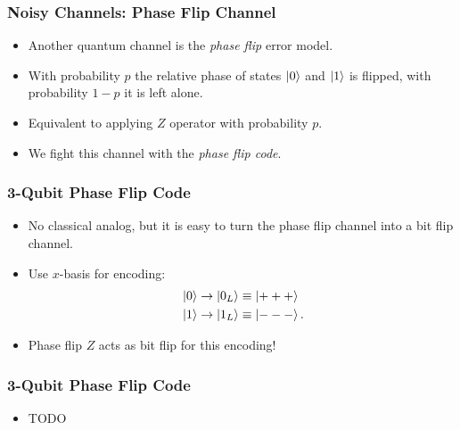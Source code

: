 \documentclass{beamer}
\begin{document}
\begin{frame}
    \frametitle{Noisy Channels: Phase Flip Channel}
    \begin{itemize}
        \item Another quantum channel is the \textit{phase flip} error model.
        \item With probability $p$ the relative phase of states $\left\vert{0}\right\rangle$ and $\left\vert{1}\right\rangle$ is flipped, with probability $1-p$ it is left alone.
        \item Equivalent to applying $Z$ operator with probability $p$.
        \item We fight this channel with the \textit{phase flip code}.
    \end{itemize}
\end{frame}

\begin{frame}
    \frametitle{3-Qubit Phase Flip Code}
    \begin{itemize}
        \item No classical analog, but it is easy to turn the phase flip channel into a bit flip channel.
        \item Use $x$-basis for encoding:
        \begin{align*}
            &\left\vert{0}\right\rangle \rightarrow \left\vert{0_L}\right\rangle \equiv \left\vert{+++}\right\rangle \\
            &\left\vert{1}\right\rangle \rightarrow \left\vert{1_L}\right\rangle \equiv \left\vert{---}\right\rangle.
        \end{align*}    
        \item Phase flip $Z$ acts as bit flip for this encoding!

    \end{itemize}
\end{frame}

\begin{frame}
    \frametitle{3-Qubit Phase Flip Code}
    \begin{itemize}
        \item TODO

    \end{itemize}
\end{frame}
\end{document}
